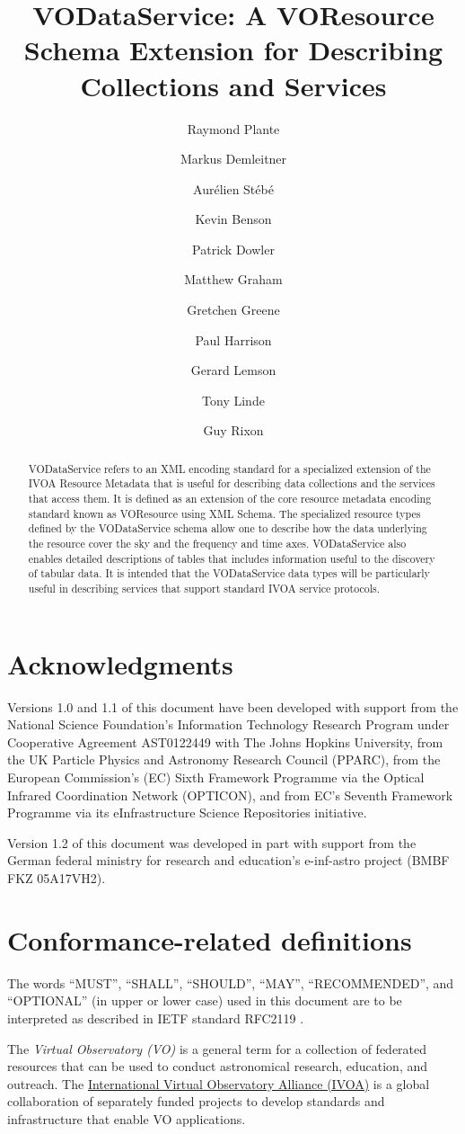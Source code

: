 \documentclass[11pt,a4paper]{ivoa}
\title{VODataService: A VOResource Schema Extension for Describing
Collections and Services}
\author[http://www.ivoa.net/twiki/bin/view/IVOA/RayPlante]{Raymond Plante}
\author[http://www.ivoa.net/twiki/bin/view/IVOA/MarkusDemleitner]{Markus Demleitner}
\author[http://www.ivoa.net/twiki/bin/view/IVOA/AurelienStebe]{Aurélien Stébé}
\author[http://www.ivoa.net/twiki/bin/view/IVOA/KevinBenson]{Kevin Benson}
\author[http://www.ivoa.net/twiki/bin/view/IVOA/PatrickDowler]{Patrick Dowler}
\author[http://www.ivoa.net/twiki/bin/view/IVOA/MatthewGraham]{Matthew Graham}
\author[http://www.ivoa.net/twiki/bin/view/IVOA/GretchenGreene]{Gretchen Greene}
\author[http://www.ivoa.net/twiki/bin/view/IVOA/PaulHarrison]{Paul Harrison}
\author[http://www.ivoa.net/twiki/bin/view/IVOA/GerardLemson]{Gerard Lemson}
\author[http://www.ivoa.net/twiki/bin/view/IVOA/TonyLinde]{Tony Linde}
\author[http://www.ivoa.net/twiki/bin/view/IVOA/GuyRixon]{Guy Rixon}
\begin{document}
\begin{abstract}
VODataService refers to an XML encoding standard for a specialized
extension of the IVOA Resource Metadata that is useful for describing
data collections and the services that access them.  It is defined as
an extension of the core resource metadata encoding standard known as
VOResource \citep{2018ivoa.spec.0625P} using XML Schema.
The specialized resource types defined by the VODataService schema
allow one to describe how the data underlying the resource cover the
sky and the frequency and time axes.  
VODataService also enables detailed
descriptions of tables that includes information useful to the
discovery of tabular data.  It is intended that the VODataService data
types will be particularly useful in describing services that support
standard IVOA service protocols.  
\end{abstract}

\section*{Acknowledgments}

Versions 1.0 and 1.1 of this document have been developed with support from the
National Science Foundation's
Information Technology Research Program under Cooperative Agreement
AST0122449 with The Johns Hopkins University, from the
UK Particle Physics and Astronomy
Research Council (PPARC), from the European Commission's (EC)
Sixth
Framework Programme via the 
Optical Infrared Coordination Network (OPTICON), and from EC's
Seventh Framework Programme
via its
eInfrastructure Science Repositories initiative.

Version 1.2 of this document was developed in part with support from the
German federal ministry for research and education's e-inf-astro project (BMBF
FKZ 05A17VH2).


\section*{Conformance-related definitions}

The words ``MUST'', ``SHALL'', ``SHOULD'', ``MAY'', ``RECOMMENDED'', and
``OPTIONAL'' (in upper or lower case) used in this document are to be
interpreted as described in IETF standard RFC2119 \citep{std:RFC2119}.

The \emph{Virtual Observatory (VO)} is a
general term for a collection of federated resources that can be used
to conduct astronomical research, education, and outreach.
The \href{http://www.ivoa.net}{International
Virtual Observatory Alliance (IVOA)} is a global
collaboration of separately funded projects to develop standards and
infrastructure that enable VO applications.
\end{document}

